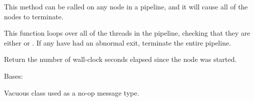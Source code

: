 \documentclass[letterpaper,10pt,english]{sphinxmanual}
\begin{document}
\begin{fulllineitems}

\begin{fulllineitems}
\label{\detokenize{api:nanostream.node.NanoNode.terminate_pipeline}}
This method can be called on any node in a pipeline, and it will cause
all of the nodes to terminate.

\end{fulllineitems}


\begin{fulllineitems}
\label{\detokenize{api:nanostream.node.NanoNode.thread_monitor}}
This function loops over all of the threads in the pipeline, checking
that they are either  or . If any have had an
abnormal exit, terminate the entire pipeline.

\end{fulllineitems}


\begin{fulllineitems}
\label{\detokenize{api:nanostream.node.NanoNode.time_running}}
Return the number of wall-clock seconds elapsed since the node was
started.

\end{fulllineitems}


\end{fulllineitems}


\begin{fulllineitems}
\label{\detokenize{api:nanostream.node.NothingToSeeHere}}
Bases: 

Vacuous class used as a no-op message type.

\end{fulllineitems}

\end{document}
